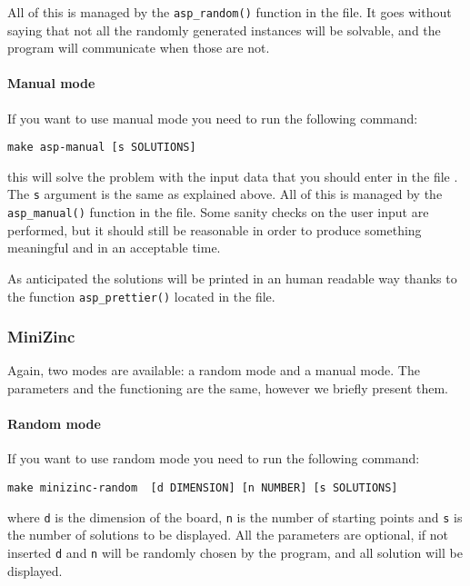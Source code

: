 All of this is managed by the \texttt{asp_random()} function in the  file. 
It goes without saying that not all the randomly generated instances will be solvable, and the program will communicate when those are not.

\paragraph{Manual mode}

If you want to use manual mode you need to run the following command:
\begin{verbatim}
make asp-manual [s SOLUTIONS]
\end{verbatim}
this will solve the problem with the input data that you should enter in the file . The \texttt{s} argument is the same as explained above. All of this is managed by the \texttt{asp_manual()} function in the  file.
Some sanity checks on the user input are performed, but it should still be reasonable in order to produce something meaningful and in an acceptable time.

As anticipated the solutions will be printed in an human readable way thanks to the function \texttt{asp_prettier()} located in the  file.

\subsubsection{MiniZinc}
Again, two modes are available: a random mode and a manual mode. The parameters and the functioning are the same, however we briefly present them.

\paragraph{Random mode}

If you want to use random mode you need to run the following command:
\begin{verbatim}
make minizinc-random  [d DIMENSION] [n NUMBER] [s SOLUTIONS]
\end{verbatim}
where \texttt{d} is the dimension of the board, \texttt{n} is the number of starting points and \texttt{s} is the number of solutions to be displayed. All the parameters are optional, if not inserted  \texttt{d} and  \texttt{n} will be randomly chosen by the program, and all solution will be displayed.

